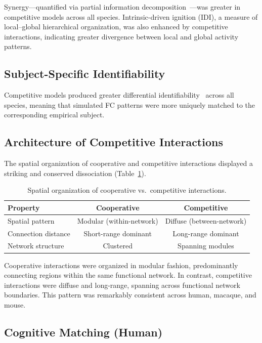 \documentclass[11pt]{article}
\begin{document}
Synergy---quantified via partial information decomposition~\citep{williams2019partial,luppi2022synergy}---was greater in competitive models across all species.  Intrinsic-driven ignition (IDI), a measure of local--global hierarchical organization, was also enhanced by competitive interactions, indicating greater divergence between local and global activity patterns.

\subsection{Subject-Specific Identifiability}

Competitive models produced greater differential identifiability~\citep{amico2018fingerprint,finn2015connectomics} across all species, meaning that simulated FC patterns were more uniquely matched to the corresponding empirical subject.

\subsection{Architecture of Competitive Interactions}

The spatial organization of cooperative and competitive interactions displayed a striking and conserved dissociation (Table~\ref{tab:architecture}).

\begin{table}[ht]
\centering
\caption{Spatial organization of cooperative vs.\ competitive interactions.}
\label{tab:architecture}
\begin{tabular}{@{}lcc@{}}
\toprule
Property & Cooperative & Competitive \\
\midrule
Spatial pattern & Modular (within-network) & Diffuse (between-network) \\
Connection distance & Short-range dominant & Long-range dominant \\
Network structure & Clustered & Spanning modules \\
\bottomrule
\end{tabular}
\end{table}

Cooperative interactions were organized in modular fashion, predominantly connecting regions within the same functional network.  In contrast, competitive interactions were diffuse and long-range, spanning across functional network boundaries.  This pattern was remarkably consistent across human, macaque, and mouse.

\subsection{Cognitive Matching (Human)}
\end{document}
